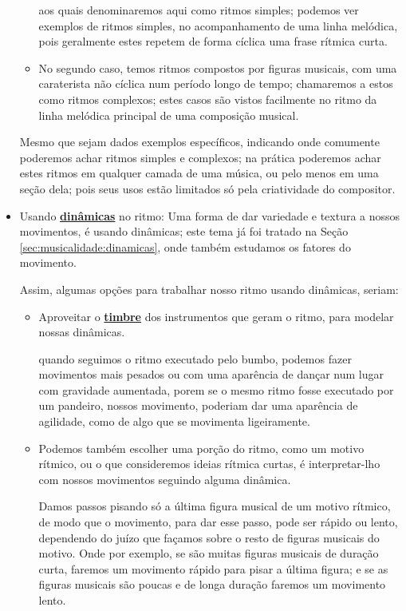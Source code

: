 \begin{itemize}
\begin{itemize}
aos quais denominaremos aqui como ritmos simples; podemos ver exemplos de ritmos simples,
no acompanhamento de uma linha melódica, 
pois geralmente estes repetem de forma cíclica uma frase rítmica curta.
\item No segundo caso, temos  ritmos compostos por figuras musicais,
com uma caraterista não cíclica num período longo de tempo; 
chamaremos a estos como ritmos complexos;
estes casos são vistos facilmente no ritmo da linha melódica principal de uma composição musical.
\end{itemize}
Mesmo que sejam dados exemplos específicos, 
indicando onde comumente poderemos achar ritmos simples e complexos;
na prática poderemos achar estes ritmos em qualquer camada de uma música,
ou pelo menos em uma seção dela; 
pois seus usos estão limitados só pela criatividade do compositor.
\item Usando \hyperref[sec:musicalidade:dinamicas]{\textbf{dinâmicas}} no ritmo: 
Uma forma de dar variedade e textura a nossos movimentos, 
é usando dinâmicas; este tema já foi tratado na Seção \ref{sec:musicalidade:dinamicas},
onde também estudamos os fatores do movimento.

Assim, algumas opções para trabalhar nosso ritmo usando dinâmicas, seriam:
\begin{itemize}
\item Aproveitar o \hyperref[sec:pos:timbre]{\textbf{timbre}} dos instrumentos que geram o ritmo,
para modelar nossas dinâmicas.
\begin{example}
quando seguimos  o ritmo executado pelo bumbo,
podemos fazer movimentos mais pesados ou com uma aparência de dançar num lugar com gravidade aumentada,
porem se o mesmo ritmo fosse executado por um pandeiro,
nossos movimento,
poderiam dar uma aparência de agilidade, 
como de algo que se movimenta ligeiramente.
\end{example}
\item Podemos também escolher uma porção do ritmo, como um motivo rítmico,
 ou o que consideremos ideias rítmica curtas,
é interpretar-lho com nossos movimentos seguindo alguma dinâmica.
\begin{example}
Damos passos pisando só a última figura musical de um motivo rítmico,
de modo que o movimento, para dar esse passo, pode ser rápido ou lento,
dependendo do juízo que façamos sobre o resto de figuras musicais do motivo.
Onde por exemplo, se são muitas figuras musicais de duração curta, 
faremos um movimento rápido para pisar a última figura;
e se as figuras musicais são poucas e de longa duração faremos um movimento lento.
\end{example}
\end{itemize}
\end{itemize}

